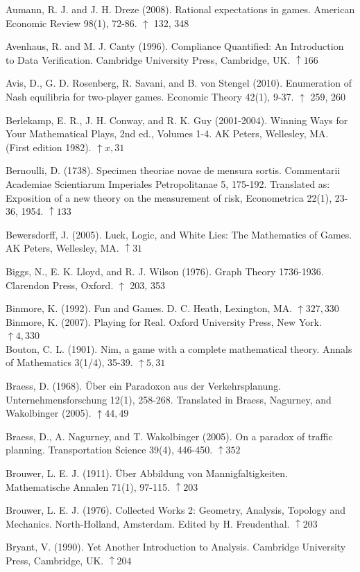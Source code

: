 \documentclass[12pt]{article}
\begin{document}
Aumann, R. J. and J. H. Dreze (2008). Rational expectations in games. American Economic Review 98(1), 72-86. $\uparrow$ 132, 348

Avenhaus, R. and M. J. Canty (1996). Compliance Quantified: An Introduction to Data Verification. Cambridge University Press, Cambridge, UK. $\uparrow 166$

Avis, D., G. D. Rosenberg, R. Savani, and B. von Stengel (2010). Enumeration of Nash equilibria for two-player games. Economic Theory 42(1), 9-37. $\uparrow$ 259, 260

Berlekamp, E. R., J. H. Conway, and R. K. Guy (2001-2004). Winning Ways for Your Mathematical Plays, 2nd ed., Volumes 1-4. AK Peters, Wellesley, MA. (First edition 1982). $\uparrow x, 31$

Bernoulli, D. (1738). Specimen theoriae novae de mensura sortis. Commentarii Academiae Scientiarum Imperiales Petropolitanae 5, 175-192. Translated as: Exposition of a new theory on the measurement of risk, Econometrica 22(1), 23-36, 1954. $\uparrow 133$

Bewersdorff, J. (2005). Luck, Logic, and White Lies: The Mathematics of Games. AK Peters, Wellesley, MA. $\uparrow 31$

Biggs, N., E. K. Lloyd, and R. J. Wilson (1976). Graph Theory 1736-1936. Clarendon Press, Oxford. $\uparrow$ 203, 353

Binmore, K. (1992). Fun and Games. D. C. Heath, Lexington, MA. $\uparrow 327,330$\\
Binmore, K. (2007). Playing for Real. Oxford University Press, New York. $\uparrow 4,330$\\
Bouton, C. L. (1901). Nim, a game with a complete mathematical theory. Annals of Mathematics 3(1/4), 35-39. $\uparrow 5,31$

Braess, D. (1968). Über ein Paradoxon aus der Verkehrsplanung. Unternehmensforschung 12(1), 258-268. Translated in Braess, Nagurney, and Wakolbinger (2005). $\uparrow 44,49$

Braess, D., A. Nagurney, and T. Wakolbinger (2005). On a paradox of traffic planning. Transportation Science 39(4), 446-450. $\uparrow 352$

Brouwer, L. E. J. (1911). Über Abbildung von Mannigfaltigkeiten. Mathematische Annalen 71(1), 97-115. $\uparrow 203$

Brouwer, L. E. J. (1976). Collected Works 2: Geometry, Analysis, Topology and Mechanics. North-Holland, Amsterdam. Edited by H. Freudenthal. $\uparrow 203$

Bryant, V. (1990). Yet Another Introduction to Analysis. Cambridge University Press, Cambridge, UK. $\uparrow 204$
\end{document}
